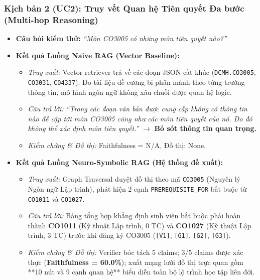 \documentclass[a4paper,12pt]{article}
\begin{document}
\subsubsection{Kịch bản 2 (UC2): Truy vết Quan hệ Tiên quyết Đa bước (Multi-hop Reasoning)}
\begin{itemize}[noitemsep]
    \item \textbf{Câu hỏi kiểm thử:} \textit{``Môn CO3005 có những môn tiên quyết nào?''}
    \item \textbf{Kết quả Luồng Naive RAG (Vector Baseline):}
    \begin{itemize}[noitemsep]
        \item \textit{Truy xuất:} Vector retriever trả về các đoạn JSON cắt khúc (\texttt{DCMH.CO3005}, \texttt{CO3031}, \texttt{CO4337}). Do tài liệu đề cương bị phân mảnh theo từng trường thông tin, mô hình ngôn ngữ không xâu chuỗi được quan hệ logic.
        \item \textit{Câu trả lời:} \textit{``Trong các đoạn văn bản được cung cấp không có thông tin nào đề cập tới môn CO3005 cũng như các môn tiên quyết của nó. Do đó không thể xác định môn tiên quyết.''} $\rightarrow$ \textbf{Bỏ sót thông tin quan trọng.}
        \item \textit{Kiểm chứng \& Đồ thị:} Faithfulness = N/A, Đồ thị: None.
    \end{itemize}
    \item \textbf{Kết quả Luồng Neuro-Symbolic RAG (Hệ thống đề xuất):}
    \begin{itemize}[noitemsep]
        \item \textit{Truy xuất:} Graph Traversal duyệt đồ thị theo mã \texttt{CO3005} (Nguyên lý Ngôn ngữ Lập trình), phát hiện 2 cạnh \texttt{PREREQUISITE\_FOR} bắt buộc từ \texttt{CO1011} và \texttt{CO1027}.
        \item \textit{Câu trả lời:} Bảng tổng hợp khẳng định sinh viên bắt buộc phải hoàn thành \textbf{CO1011} (Kỹ thuật Lập trình, 0 TC) và \textbf{CO1027} (Kỹ thuật Lập trình, 3 TC) trước khi đăng ký CO3005 (\texttt{[V1]}, \texttt{[G1]}, \texttt{[G2]}, \texttt{[G3]}).
        \item \textit{Kiểm chứng \& Đồ thị:} Verifier bóc tách 5 claims; 3/5 claims được xác thực (\textbf{Faithfulness = 60.0\%}); xuất mạng lưới đồ thị trực quan gồm **10 nút và 9 cạnh quan hệ** biểu diễn toàn bộ lộ trình học tập liên đới.
    \end{itemize}
\end{itemize}
\end{document}
